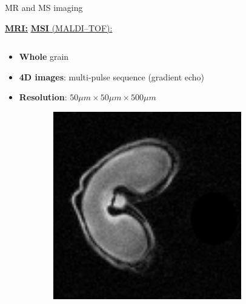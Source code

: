 \documentclass[10pt]{beamer}
\begin{document}
\begin{frame}{MR and MS imaging}

  \underline{\textbf{MRI:}} \hspace{0.5\textwidth} \underline{\textbf{MSI} (MALDI--TOF):}

  \begin{columns}
    \begin{column}[t]{.5\textwidth}
      \begin{itemize}
      \item \textbf{Whole} grain
      \item \textbf{4D images}:  \alert{multi-pulse} sequence (gradient echo)
      \item \textbf{Resolution}: $50 \mu m \times 50 \mu m \times 500 \mu m$
      \end{itemize}
      \vspace{1cm}
      \begin{figure}[ht]
        \centering
        \begin{subfigure}[t]{0.33\textwidth}
          \centering \includegraphics[width=0.9\textwidth]{fig/echo2_1}
        \end{subfigure}%
        \begin{subfigure}[t]{0.33\textwidth}

\end{subfigure}
\end{figure}
\end{column}
\end{columns}
\end{frame}
\end{document}
